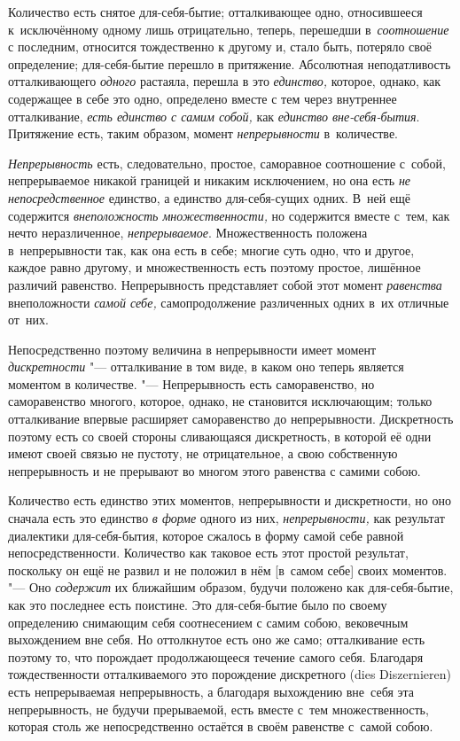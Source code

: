 

Количество есть снятое для-себя-бытие; отталкивающее одно, относившееся
к~исключённому одному лишь отрицательно, теперь, перешедши в~{\em соотношение}
с последним, относится тождественно к другому и, стало быть, потеряло своё
определение; для-себя-бытие перешло в притяжение. Абсолютная неподатливость
отталкивающего {\em одного} растаяла, перешла в это {\em единство,} которое,
однако, как содержащее в себе это одно, определено вместе с тем через
внутреннее отталкивание, {\em есть единство с самим собой,} как
{\em единство вне-себя-бытия}. Притяжение есть, таким образом, момент
{\em непрерывности} в~количестве.

{\em Непрерывность} есть, следовательно, простое, саморавное соотношение
с~собой, непрерываемое никакой границей и никаким исключением, но она есть
{\em не непосредственное} единство, а единство для-себя-сущих одних. В~ней
ещё содержится {\em внеположность множественности,} но содержится вместе
с~тем, как нечто неразличенное, {\em непрерываемое}. Множественность положена
в~непрерывности так, как она есть в себе; многие суть одно, что и другое,
каждое равно другому, и множественность есть поэтому простое, лишённое
различий равенство. Непрерывность представляет собой этот момент
{\em равенства} внеположности {\em самой себе,} самопродолжение различенных
одних в~их отличные от~них.

Непосредственно поэтому величина в непрерывности имеет момент
{\em дискретности} "--- отталкивание в том виде, в каком оно теперь является
моментом в количестве. "--- Непрерывность есть саморавенство, но саморавенство
многого, которое, однако, не становится исключающим; только отталкивание
впервые расширяет саморавенство до непрерывности. Дискретность поэтому есть
со своей стороны сливающаяся дискретность, в которой её одни имеют своей связью
не пустоту, не отрицательное, а свою собственную непрерывность и не прерывают
во многом этого равенства с самими собою.

Количество есть единство этих моментов, непрерывности и дискретности, но оно
сначала есть это единство {\em в форме} одного из них, {\em непрерывности,} как
результат диалектики для-себя-бытия, которое сжалось в форму самой себе равной
непосредственности. Количество как таковое есть этот простой результат,
поскольку он ещё не развил и не положил в нём [в~самом себе] своих моментов.
"--- Оно {\em содержит} их ближайшим образом, будучи положено как
для-себя-бытие, как это последнее есть поистине. Это для-себя-бытие было по
своему определению снимающим себя соотнесением с самим собою, вековечным
выхождением вне себя. Но оттолкнутое есть оно же само; отталкивание есть
поэтому то, что порождает продолжающееся течение самого себя. Благодаря
тождественности отталкиваемого это порождение дискретного (dies
Dis\-zer\-nie\-ren) есть непрерываемая непрерывность, а благодаря выхождению
вне~себя эта непрерывность, не будучи прерываемой, есть вместе с~тем
множественность, которая столь же непосредственно остаётся в своём равенстве
с~самой собою.

